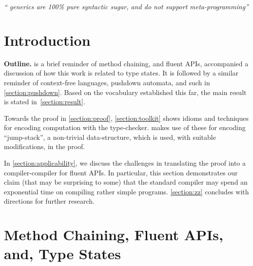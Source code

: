 \documentclass[a4paper,USenglish]{lipics-v2016}
\author[1]{Yossi Gil}
\author[1]{Tomer Levy}
\affil[1]{%
 Department of Computer Science, The
 Technion---Israel Institute of Technology, Haifa, Israel.
}
\begin{document}
\maketitle
\hfill
\parbox{40ex}{%
  \begin{flushright}
    \scriptsize\itshape `` generics are 100\% pure syntactic sugar,
    and do not support meta-programming''\footnotemark
  \end{flushright}
}
\newline


\begin{abstract}
  
\end{abstract}

\section{Introduction}


\textbf{Outline.} \small
{} is a brief reminder of method chaining, 
  and fluent APIs, accompanied a discussion of how this work is related to type states.
It is followed by a similar reminder of context-free languages, pushdown automata, 
  and such in \cref{section:pushdown}.
Based on the vocabulary established this far, 
  the main result is stated in~\cref{section:result}.
  
Towards the proof in \cref{section:proof}, \cref{section:toolkit} 
  shows idioms and techniques for encoding computation with    
  the \Java type-checker.
 makes use of these for encoding 
  ``jump-stack'', a non-trivial data-structure,
  which is used, with suitable modifications, in the proof. 

In \cref{section:applicability}, we discuss the challenges in
  translating the proof into a compiler-compiler for fluent APIs.
In particular, this section demonstrates our claim (that may be
  surprising to some) that the standard \Java compiler may spend
  an exponential time on compiling rather simple programs.
\cref{section:zz} concludes with directions for further research.
\normalsize

\section{Method Chaining, Fluent APIs, and, Type States}
\label{section:fluent}

\end{document}
